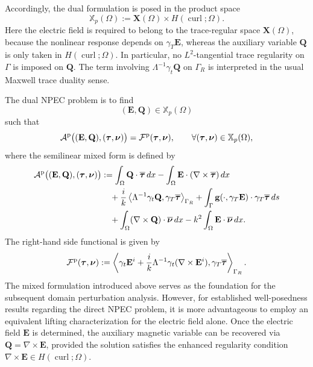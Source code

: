 \documentclass[12pt,reqno]{amsart}
\theoremstyle{definition}
\numberwithin{equation}{section}
\begin{document}
Accordingly, the dual  formulation is posed in the product space
\[
\mathbb X_p(\Omega)
:=
\mathbf X(\Omega)\times H(\operatorname{curl};\Omega).
\]
Here the electric field is required to belong to the trace-regular space
\(\mathbf X(\Omega)\), because the nonlinear response depends on
\(\gamma_T\mathbf E\), whereas the auxiliary variable \(\mathbf Q\) is only
taken in \(H(\operatorname{curl};\Omega)\). In particular, no \(L^2\)-tangential
trace regularity on \(\Gamma\) is imposed on \(\mathbf Q\). The term involving
\(\Lambda^{-1}\gamma_t\mathbf Q\) on \(\Gamma_R\) is interpreted in the usual
Maxwell trace duality sense.

The dual NPEC problem is to find
\[
(\mathbf E,\mathbf Q)\in\mathbb X_p(\Omega)
\]
such that
\begin{equation}\label{eq:mixed_formulation}
\mathcal A^{\rm p}
\bigl((\mathbf E,\mathbf Q),(\boldsymbol\tau,\boldsymbol\nu)\bigr)
=
\mathcal F^{\rm p}(\boldsymbol\tau,\boldsymbol\nu),
\qquad
\forall(\boldsymbol\tau,\boldsymbol\nu)\in\mathbb X_p(\Omega),
\end{equation}
where the semilinear mixed form is defined by
\begin{equation}\label{eq:mixed_form}
\begin{aligned}
\mathcal A^{\rm p}
\bigl((\mathbf E,\mathbf Q),(\boldsymbol\tau,\boldsymbol\nu)\bigr)
&:=
\int_\Omega
\mathbf Q\cdot\overline{\boldsymbol\tau}\,dx
-
\int_\Omega
\mathbf E\cdot(\nabla\times\overline{\boldsymbol\tau})\,dx\\
&\quad
+
\frac{i}{k}
\left\langle
\Lambda^{-1}\gamma_t\mathbf Q,
\gamma_T\overline{\boldsymbol\tau}
\right\rangle_{\Gamma_R}
+
\int_\Gamma
\mathbf g(\cdot,\gamma_T\mathbf E)
\cdot
\gamma_T\overline{\boldsymbol\tau}\,ds\\
&\quad+
\int_\Omega
(\nabla\times\mathbf Q)\cdot\overline{\boldsymbol\nu}\,dx-
k^2
\int_\Omega
\mathbf E\cdot\overline{\boldsymbol\nu}\,dx .
\end{aligned}
\end{equation}
The right-hand side functional is given by
\begin{equation}\label{eq:mixed_rhs}
\mathcal F^{\rm p}(\boldsymbol\tau,\boldsymbol\nu)
:=
\left\langle
\gamma_t\mathbf E^i
+
\frac{i}{k}\Lambda^{-1}\gamma_t(\nabla\times\mathbf E^i),
\gamma_T\overline{\boldsymbol\tau}
\right\rangle_{\Gamma_R}.
\end{equation}
The mixed formulation introduced above serves as the foundation for the subsequent domain perturbation analysis. However, for established well-posedness results regarding the direct NPEC problem, it is more advantageous to employ an equivalent lifting characterization for the electric field alone. Once the electric field $\mathbf{E}$ is determined, the auxiliary magnetic variable can be recovered via $\mathbf{Q} = \nabla \times \mathbf{E}$, provided the solution satisfies the enhanced regularity condition $\nabla \times \mathbf{E} \in H(\operatorname{curl};\Omega)$.
\end{document}
